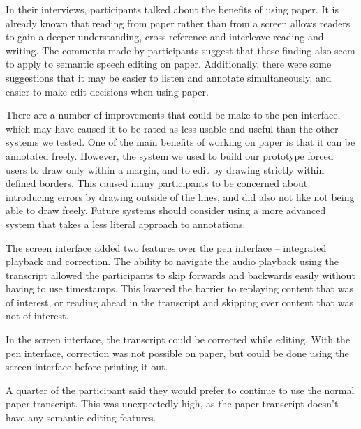 In their interviews, participants talked about the benefits of using paper. It is already known that reading from paper
rather than from a screen allows readers to gain a deeper understanding, cross-reference and interleave reading and
writing.  The comments made by participants suggest that these finding also seem to apply to semantic speech editing on
paper. Additionally, there were some suggestions that it may be easier to listen and annotate simultaneously, and
easier to make edit decisions when using paper.

There are a number of improvements that could be make to the pen interface, which may have caused it to be rated as
less usable and useful than the other systems we tested. One of the main benefits of working on
paper is that it can be annotated freely. However, the system we used to build our prototype forced users to draw only
within a margin, and to edit by drawing strictly within defined borders. This caused many participants to be concerned
about introducing errors by drawing outside of the lines, and did also not like not being able to draw freely.
Future systems should consider using a more advanced system that takes a less literal approach to annotations.

The screen interface added two features over the pen interface -- integrated playback and correction. The ability to
navigate the audio playback using the transcript allowed the participants to skip forwards and backwards easily
without having to use timestamps. This lowered the barrier to replaying content that was of interest, or reading ahead
in the transcript and skipping over content that was not of interest.

In the screen interface, the transcript could be corrected while editing. With the pen interface, correction was not
possible on paper, but could be done using the screen interface before printing it out.

A quarter of the participant said they would prefer to continue to use the normal paper transcript. This was
unexpectedly high, as the paper transcript doesn't have any semantic editing features.


